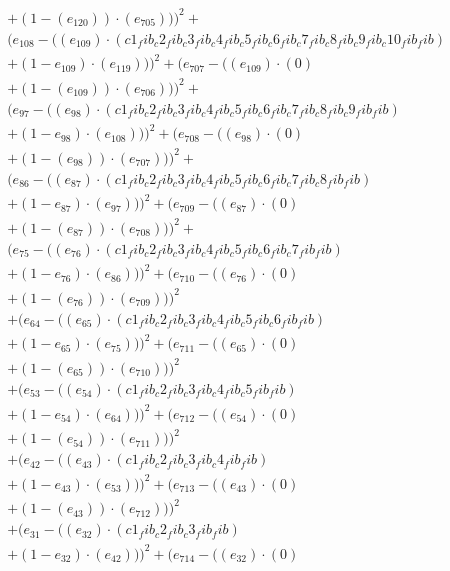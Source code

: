 \documentclass[10pt, a4paper]{article}
\begin{document}
\begin{align*}
& + (1 - (e_{120})) \cdot (e_{705})))^{2} + \\
& (e_{108} - ((e_{109})  \cdot  (c1_fib_c2_fib_c3_fib_c4_fib_c5_fib_c6_fib_c7_fib_c8_fib_c9_fib_c10_fib_fib) \\
& + (1 - e_{109})  \cdot  (e_{119})))^{2} + (e_{707} - ((e_{109}) \cdot (0) \\
& + (1 - (e_{109})) \cdot (e_{706})))^{2} + \\
& (e_{97} - ((e_{98})  \cdot  (c1_fib_c2_fib_c3_fib_c4_fib_c5_fib_c6_fib_c7_fib_c8_fib_c9_fib_fib) \\
& + (1 - e_{98})  \cdot  (e_{108})))^{2} + (e_{708} - ((e_{98}) \cdot (0) \\
& + (1 - (e_{98})) \cdot (e_{707})))^{2} + \\
& (e_{86} - ((e_{87})  \cdot  (c1_fib_c2_fib_c3_fib_c4_fib_c5_fib_c6_fib_c7_fib_c8_fib_fib) \\
& + (1 - e_{87})  \cdot  (e_{97})))^{2} + (e_{709} - ((e_{87}) \cdot (0) \\
& + (1 - (e_{87})) \cdot (e_{708})))^{2} + \\
& (e_{75} - ((e_{76})  \cdot  (c1_fib_c2_fib_c3_fib_c4_fib_c5_fib_c6_fib_c7_fib_fib) \\
& + (1 - e_{76})  \cdot  (e_{86})))^{2} + (e_{710} - ((e_{76}) \cdot (0) \\
& + (1 - (e_{76})) \cdot (e_{709})))^{2} \\
& + (e_{64} - ((e_{65})  \cdot  (c1_fib_c2_fib_c3_fib_c4_fib_c5_fib_c6_fib_fib) \\
& + (1 - e_{65})  \cdot  (e_{75})))^{2} + (e_{711} - ((e_{65}) \cdot (0) \\
& + (1 - (e_{65})) \cdot (e_{710})))^{2} \\
& + (e_{53} - ((e_{54})  \cdot  (c1_fib_c2_fib_c3_fib_c4_fib_c5_fib_fib) \\
& + (1 - e_{54})  \cdot  (e_{64})))^{2} + (e_{712} - ((e_{54}) \cdot (0) \\
& + (1 - (e_{54})) \cdot (e_{711})))^{2} \\
& + (e_{42} - ((e_{43})  \cdot  (c1_fib_c2_fib_c3_fib_c4_fib_fib) \\
& + (1 - e_{43})  \cdot  (e_{53})))^{2} + (e_{713} - ((e_{43}) \cdot (0) \\
& + (1 - (e_{43})) \cdot (e_{712})))^{2} \\
& + (e_{31} - ((e_{32})  \cdot  (c1_fib_c2_fib_c3_fib_fib) \\
& + (1 - e_{32})  \cdot  (e_{42})))^{2} + (e_{714} - ((e_{32}) \cdot (0) \\

\end{align*}
\end{document}
